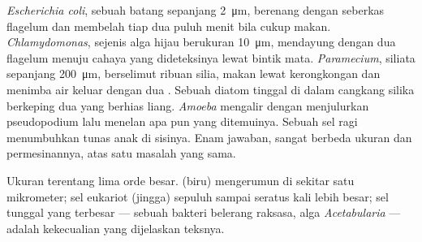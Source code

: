 \begin{example}\label{ex:b2:unicellular-diversity:drop}
\emph{Escherichia coli}, sebuah batang sepanjang \qty{2}{\micro m},
berenang dengan seberkas flagelum dan membelah tiap dua puluh menit
bila cukup makan. \emph{Chlamydomonas}, sejenis alga hijau berukuran
\qty{10}{\micro m}, mendayung dengan dua flagelum menuju cahaya yang
dideteksinya lewat bintik mata. \emph{Paramecium}, siliata sepanjang
\qty{200}{\micro m}, berselimut ribuan silia, makan lewat kerongkongan
dan menimba air keluar dengan dua . Sebuah diatom
tinggal di dalam cangkang silika berkeping dua yang berhias liang.
\emph{Amoeba} mengalir dengan menjulurkan pseudopodium lalu menelan apa
pun yang ditemuinya. Sebuah sel ragi menumbuhkan tunas anak di
sisinya. Enam jawaban, sangat berbeda ukuran dan permesinannya, atas
satu masalah yang sama.
\end{example}

\begin{omfigure}

{\small Ukuran  terentang lima orde besar.
 (biru) mengerumun di sekitar satu mikrometer; sel eukariot
(jingga) sepuluh sampai seratus kali lebih besar; sel tunggal yang
terbesar --- sebuah bakteri belerang raksasa, alga \emph{Acetabularia}
--- adalah kekecualian yang dijelaskan teksnya.}
\end{omfigure}

